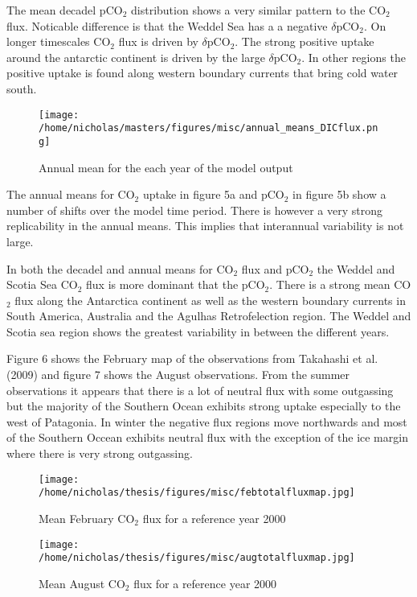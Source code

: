 \documentclass[11pt, a4paper]{article}
\numberwithin{figure}{section}
\numberwithin{table}{section}
\begin{document}
The mean decadel pCO$_2$ distribution shows a very similar pattern to the 
CO$_2$ flux. Noticable difference is that the Weddel Sea has a a negative 
$\delta$pCO$_2$. On longer timescales CO$_2$ flux is driven by $\delta$pCO$_2$.
The strong positive uptake around the antarctic continent is driven by the large
$\delta$pCO$_2$. In other regions the positive uptake is found along western 
boundary currents that bring cold water south.

  \begin{figure}[H]
  \caption{Annual mean for the each year of the model output}
  \centering
  \texttt{[image: /home/nicholas/masters/figures/misc/annual\_means\_DICflux.png]}
  \end{figure}
  
The annual means for CO${_2}$ uptake in figure 5a and pCO${_2}$ in figure 5b  
show a number of shifts over the model time period. There is however a very 
strong replicability in the annual means. This implies that interannual 
variability is not large. 

In both the decadel and annual means for CO${_2}$ flux and
pCO${_2}$ the Weddel and Scotia Sea CO${_2}$ flux is more dominant that the pCO${_2}$.
There is a strong mean CO${_2}$ flux along the Antarctica continent as well
as the western boundary currents in South America, Australia and 
the Agulhas Retrofelection region.
The Weddel and Scotia sea region shows the greatest variability in between the
different years.

Figure 6 shows the February map of the observations from Takahashi et al. (2009) and figure 7 shows the August observations.
From the summer observations it appears that there is a lot of neutral flux with some outgassing but the majority of the Southern Ocean
exhibits strong uptake especially to the west of Patagonia. 
In winter the negative flux regions move northwards and most of the Southern Occean exhibits
neutral flux with the exception of the ice margin where there is very strong outgassing.
 
  \begin{figure}[H]
  \caption{Mean February CO$_2$ flux for a reference year 2000}
  \centering
  \texttt{[image: /home/nicholas/thesis/figures/misc/febtotalfluxmap.jpg]}
  \end{figure}
  
  \begin{figure}[H]
  \caption{Mean August CO$_2$ flux for a reference year 2000}
  \centering
  \texttt{[image: /home/nicholas/thesis/figures/misc/augtotalfluxmap.jpg]}
  \end{figure}
  
\end{document}
